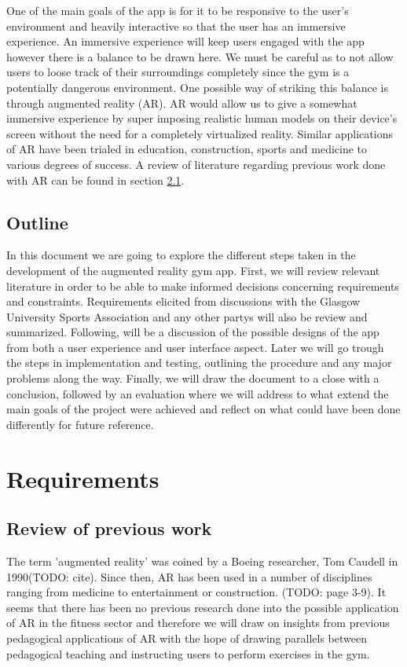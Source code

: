 \documentclass{l4proj}
\begin{document}
One of the main goals of the app is for it to be responsive to the user's environment and heavily interactive so that the user has an immersive experience. An immersive experience will keep users engaged with the app however there is a balance to be drawn here. We must be careful as to not allow users to loose track of their surroundings completely since the gym is a potentially dangerous environment. One possible way of striking this balance is through augmented reality (AR). AR would allow us to give a somewhat immersive experience by super imposing realistic human models on their device's screen without the need for a completely virtualized reality. Similar applications of AR have been trialed in education, construction, sports and medicine to various degrees of success. A review of literature regarding previous work done with AR can be found in section \ref{sec:litrew}.

\section{Outline}
In this document we are going to explore the different steps taken in the development of the augmented reality gym app. First, we will review relevant literature in order to be able to make informed decisions concerning requirements and constraints. Requirements elicited from discussions with the Glasgow University Sports Association  and any other partys will also be review and summarized. Following, will be a discussion of the possible designs of the app from both a user experience and user interface aspect. Later we will go trough the steps in implementation and testing, outlining the procedure and any major problems along the way. Finally, we will draw the document to a close with a conclusion, followed by an evaluation where we will address to what extend the main goals of the project were achieved and reflect on what could have been done differently for future reference. 

\chapter{Requirements}


\section{Review of previous work} \label{sec:litrew}
The term 'augmented reality' was coined by a Boeing researcher, Tom Caudell in 1990(TODO: cite). Since then, AR has been used in a number of disciplines ranging from medicine to entertainment or construction.\nocite{azuma_recent_2001} (TODO: page 3-9). It seems that there has been no previous research done into the possible application of AR in the fitness sector and therefore we will draw on insights from previous pedagogical applications of AR with the hope of drawing parallels between pedagogical teaching and instructing users to perform exercises in the gym. 
\end{document}
